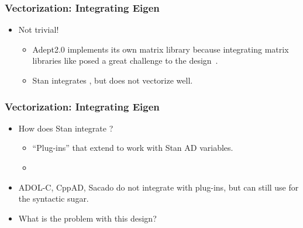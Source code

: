 \begin{frame}
\frametitle{Vectorization: Integrating Eigen}
\begin{itemize}

\item Not trivial!
    \begin{itemize}
        \item Adept2.0 implements its own matrix library because 
            integrating matrix libraries like  
            posed a great challenge to the design~\cite{hogan:2014}.
        \item Stan integrates , but does not vectorize well.
    \end{itemize}

\end{itemize}
\end{frame}

\begin{frame}
\frametitle{Vectorization: Integrating Eigen}
\begin{itemize}

\item How does Stan integrate ?
    \begin{itemize}
        \item ``Plug-ins'' that extend  to work with Stan AD variables.
        \item {} 
    \end{itemize}

\item ADOL-C, CppAD, Sacado do not integrate  with plug-ins,
    but can still use  for the syntactic sugar.

\item What is the problem with this design?

\end{itemize}
\end{frame}


